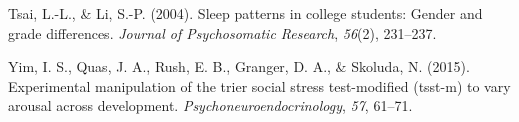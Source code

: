 \documentclass[man, fleqn, noextraspace]{apa6}
\begin{document}
\leavevmode\hypertarget{ref-tsai2004sleep}{}%
Tsai, L.-L., \& Li, S.-P. (2004). Sleep patterns in college students: Gender and grade differences. \emph{Journal of Psychosomatic Research}, \emph{56}(2), 231--237.

\leavevmode\hypertarget{ref-yim2015experimental}{}%
Yim, I. S., Quas, J. A., Rush, E. B., Granger, D. A., \& Skoluda, N. (2015). Experimental manipulation of the trier social stress test-modified (tsst-m) to vary arousal across development. \emph{Psychoneuroendocrinology}, \emph{57}, 61--71.

\endgroup
\end{document}
